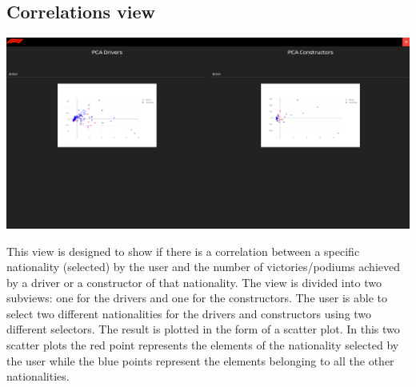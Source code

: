 \documentclass[10pt,twocolumn,letterpaper]{article}
\begin{document}
\subsection{Correlations view}
\begin{center}
	\centering
	\includegraphics[width=\columnwidth]{correlations}
\end{center}
This view is designed to show if there is a correlation between a specific nationality (selected) by the user and the number of victories/podiums achieved by a driver or a 
constructor of that nationality. The view is divided into two subviews: one for the drivers and one for the constructors. The user is able to select two different nationalities
for the drivers and constructors using two different selectors. The result is plotted in the form of a scatter plot. In this two scatter plots the red point represents the elements
of the nationality selected by the user while the blue points represent the elements belonging to all the other nationalities.
\end{document}
